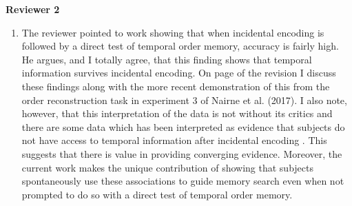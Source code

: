 \documentclass[12pt]{article}
\begin{document}
\vspace{20pt}

\textbf{\large{Reviewer 2}}

\begin{enumerate}

	\item 
	The reviewer pointed to work showing that when incidental encoding is followed by a direct test of temporal order memory, accuracy is fairly high. He argues, and I totally agree, that this finding shows that temporal information survives incidental encoding. On page \pageref{TODO-8} of the revision I discuss these findings along with the more recent demonstration of this from the order reconstruction task in experiment 3 of Nairne et al. (2017). I also note, however, that this interpretation of the data is not without its critics \cite{Hint16} and there are some data which has been interpreted as evidence that subjects do not have access to temporal information after incidental encoding \cite{BradGlen83,GlenBrad79}. This suggests that there is value in providing converging evidence. Moreover, the current work makes the unique contribution of showing that subjects spontaneously use these associations to guide memory search even when not prompted to do so with a direct test of temporal order memory. 


\end{enumerate}
\end{document}
